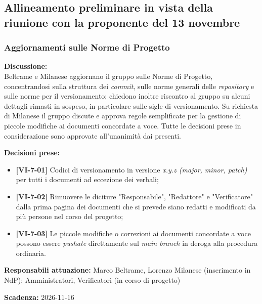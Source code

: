 \documentclass[12pt,a4paper]{article}
\newcommand{\tightlist}{\setlength{\itemsep}{1pt}\setlength{\parskip}{0pt}}
\begin{document}
\hypertarget{odg-1}{%
\subsection{Allineamento preliminare in vista della riunione con la proponente del 13 novembre}}

\subsubsection{Aggiornamenti sulle Norme di Progetto}
\textbf{Discussione:} \\
Beltrame e Milanese aggiornano il gruppo sulle Norme di Progetto, concentrandosi sulla struttura dei \textit{commit}, sulle norme generali delle \textit{repository} e sulle norme per il versionamento; chiedono inoltre riscontro al gruppo su alcuni dettagli rimasti in sospeso, in particolare sulle sigle di versionamento. Su richiesta di Milanese il gruppo discute e approva regole semplificate per la gestione di piccole modifiche ai documenti concordate a voce. Tutte le decisioni prese in considerazione sono approvate all'unanimità dai presenti.

\textbf{Decisioni prese:}
\begin{itemize}
\tightlist
\item[$\checkmark$] \textbf{[VI-7-01]} Codici di versionamento in versione \textit{x.y.z (major, minor, patch)} per tutti i documenti ad eccezione dei verbali;
\item[$\checkmark$] \textbf{[VI-7-02]} Rimuovere le diciture "Responsabile", "Redattore" e "Verificatore" dalla prima pagina dei documenti che si prevede siano redatti e modificati da più persone nel corso del progetto;
\item[$\checkmark$] \textbf{[VI-7-03]} Le piccole modifiche o correzioni ai documenti concordate a voce possono essere \textit{pushate} direttamente sul \textit{main branch} in deroga alla procedura ordinaria.
\end{itemize}

\textbf{Responsabili attuazione:} Marco Beltrame, Lorenzo Milanese (inserimento in NdP); Amministratori, Verificatori (in corso di progetto)

\textbf{Scadenza:} 2026-11-16
\end{document}
